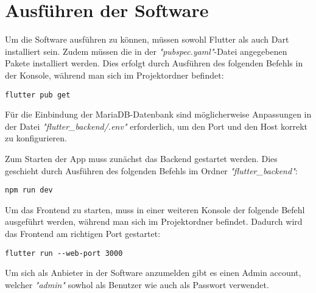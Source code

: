\chapter{Ausführen der Software}

Um die Software ausführen zu können, müssen sowohl Flutter als auch Dart installiert sein. Zudem müssen die in der \textit{"pubspec.yaml"}-Datei angegebenen Pakete installiert werden. Dies erfolgt durch Ausführen des folgenden Befehls in der Konsole, während man sich im Projektordner befindet:
\newline
\begin{lstlisting}[caption={Installieren der benötigten Pakete}, label={lst:pubget}]
    flutter pub get
\end{lstlisting}

Für die Einbindung der MariaDB-Datenbank sind möglicherweise Anpassungen in der Datei \textit{"flutter\_backend/.env"} erforderlich, um den Port und den Host korrekt zu konfigurieren.

Zum Starten der App muss zunächst das Backend gestartet werden. Dies geschieht durch Ausführen des folgenden Befehls im Ordner \textit{"flutter\_backend"}:
\newline
\begin{lstlisting}[caption={Starten des Backends}, label={lst:backend}]
    npm run dev
\end{lstlisting}

Um das Frontend zu starten, muss in einer weiteren Konsole der folgende Befehl ausgeführt werden, während man sich im Projektordner befindet. Dadurch wird das Frontend am richtigen Port gestartet:
\newline
\begin{lstlisting}[caption={Starten des Frontends}, label={lst:frontend}]
    flutter run --web-port 3000
\end{lstlisting}

Um sich als Anbieter in der Software anzumelden gibt es einen Admin account, welcher \textit{"admin"} sowhol als Benutzer wie auch als
Passwort verwendet.